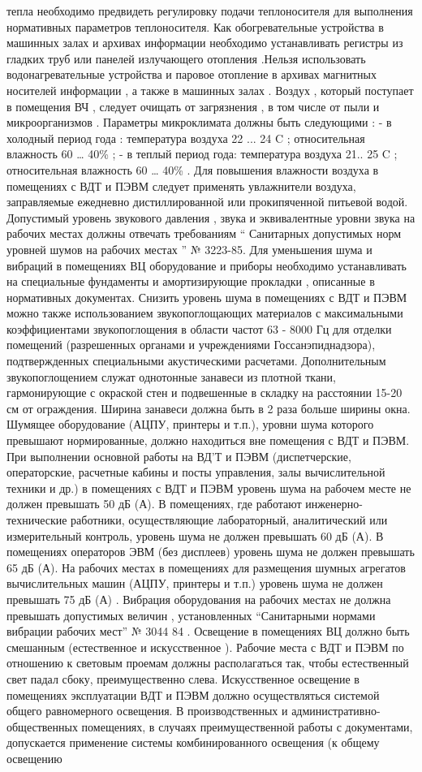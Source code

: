 тепла необходимо предвидеть регулировку подачи теплоносителя для выполнения нормативных параметров теплоносителя.
Как обогревательные устройства в машинных залах и архивах информации необходимо
устанавливать регистры из гладких труб или панелей излучающего отопления .Нельзя использовать водонагревательные устройства и паровое отопление в архивах магнитных носителей информации , а также в машинных залах . Воздух , который поступает в помещения ВЧ , следует очищать от загрязнения , в том числе от пыли и микроорганизмов . Параметры микроклимата должны быть следующими : - в холодный период года : температура воздуха 22 ... 24 C ; относительная влажность 60 … 40\% ; - в теплый период года: температура воздуха 21.. 25 C ; относительная влажность 60 … 40\% . Для повышения влажности воздуха в помещениях с ВДТ и ПЭВМ следует применять увлажнители воздуха, заправляемые ежедневно дистиллированной или прокипяченной питьевой водой. Допустимый уровень звукового давления , звука и эквивалентные уровни звука на рабочих местах должны отвечать требованиям “ Санитарных допустимых норм уровней шумов на рабочих местах ” № 3223-85. Для уменьшения шума и вибраций в помещениях ВЦ оборудование и приборы необходимо устанавливать на специальные фундаменты и амортизирующие прокладки , описанные в нормативных документах. Снизить уровень шума в помещениях с ВДТ и ПЭВМ можно также использованием звукопоглощающих материалов с максимальными коэффициентами звукопоглощения в области частот 63 - 8000 Гц для отделки помещений (разрешенных органами и учреждениями Госсанэпиднадзора), подтвержденных специальными акустическими расчетами. Дополнительным звукопоглощением служат однотонные занавеси из плотной ткани, гармонирующие с окраской стен и подвешенные в складку на расстоянии 15-20 см от ограждения. Ширина занавеси должна быть в 2 раза больше ширины окна. Шумящее оборудование (АЦПУ, принтеры и т.п.), уровни шума которого превышают нормированные, должно находиться вне помещения с ВДТ и ПЭВМ. При выполнении основной работы на ВД'Т и ПЭВМ (диспетчерские, операторские, расчетные кабины и посты управления, залы вычислительной техники и др.) в помещениях с ВДТ и ПЭВМ уровень шума на рабочем месте не должен превышать 50 дБ (А). В помещениях, где работают инженерно-технические работники, осуществляющие лабораторный, аналитический или измерительный контроль, уровень шума не должен превышать 60 дБ (А). В помещениях операторов ЭВМ (без дисплеев) уровень шума не должен превышать 65 дБ (А). На рабочих местах в помещениях для размещения шумных агрегатов вычислительных машин (АЦПУ, принтеры и т.п.) уровень шума не должен превышать 75 дБ (А) . Вибрация оборудования на рабочих местах не должна превышать допустимых величин , установленных “Санитарными нормами вибрации рабочих мест” № 3044 84 . Освещение в помещениях ВЦ должно быть смешанным (естественное и искусственное ). Рабочие места с ВДТ и ПЭВМ по отношению к световым проемам должны располагаться так, чтобы естественный свет падал сбоку, преимущественно слева. Искусственное освещение в помещениях эксплуатации ВДТ и ПЭВМ должно осуществляться системой общего равномерного освещения. В производственных и административно-общественных помещениях, в случаях преимущественной работы с документами, допускается применение системы комбинированного освещения (к общему освещению 